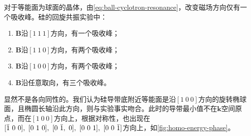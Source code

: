 对于等能面为球面的晶体，由\autoref{eq:ball-cyclotron-resonance}，改变磁场方向仅有一个吸收峰。硅的回旋共振实验中：
\begin{enumerate}[(1)]
    \item $\bm B$沿$[1\ 1\ 1]$方向，有一个吸收峰；
    \item $\bm B$沿$[1\ 1\ 0]$方向，有两个吸收峰；
    \item $\bm B$沿$[1\ 0\ 0]$方向，有两个吸收峰；
    \item $\bm B$沿任意取向，有三个吸收峰。
\end{enumerate}
显然不是各向同性的。我们认为硅导带底附近等能面是沿$[1\ 0\ 0]$方向的旋转椭球面，且椭圆长轴沿此方向，则与实验事实吻合。此时的导带最小值不在$\bm k$空间原点，而在$[1\ 0\ 0]$方向上，根据对称性，也出现在$[\Bar{1}\ 0\ 0],\ [0\ 1\ 0],\ [0\ \Bar{1},\ 0],\ [0\ 0\ 1],\ [0\ 0\ \Bar{1}]$方向上，如\autoref{fig:homo-energy-phase}。
